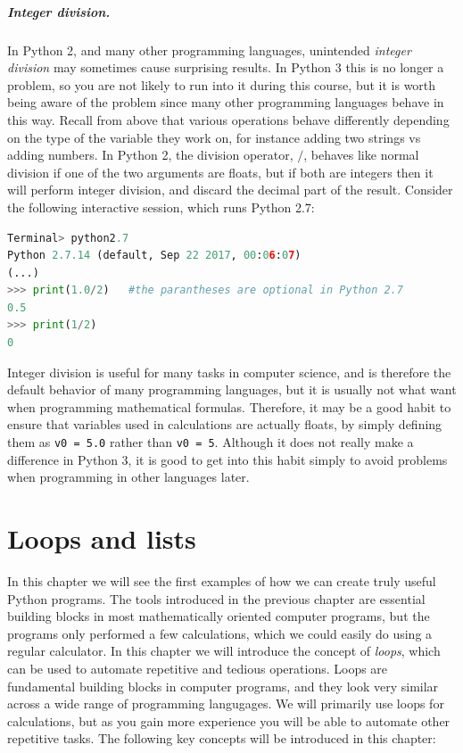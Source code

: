 \documentclass[graybox,envcountchap,sectrefs,final]{svmonodo}
\begin{document}
\paragraph{Integer division.}
In Python 2, and many other programming languages, unintended \emph{integer division} may sometimes cause surprising
results. In Python 3 this is no longer a problem, so you are not likely to run into it during this course, but
it is worth being aware of the problem since many other programming languages behave in this way. Recall from above that
various operations behave differently depending on the type of the variable they work on, for instance adding two strings
vs adding numbers. In Python 2, the division operator, $/$, behaves like normal division if one of the two arguments
are floats, but if both are integers then it will perform integer division, and discard the decimal part of the result.
Consider the following interactive session, which runs Python 2.7:
\begin{lstlisting}[language=Python,style=blue1]
Terminal> python2.7
Python 2.7.14 (default, Sep 22 2017, 00:06:07)
(...)
>>> print(1.0/2)   #the parantheses are optional in Python 2.7
0.5
>>> print(1/2)
0
\end{lstlisting}


Integer division is useful for many tasks in computer science, and is therefore the default behavior of many
programming languages, but it is usually not what want when programming mathematical formulas. Therefore, it may be
a good habit to ensure that variables used in calculations are actually floats, by simply defining them as \texttt{v0 = 5.0} rather
than \texttt{v0 = 5}. Although it does not really make a difference in Python 3, it is good to get into this habit simply to avoid
problems when programming in other languages later.

\chapter{Loops and lists}
\label{ch:loops}


In this chapter we will see the first examples of how we can create truly useful Python programs.
The tools introduced in the previous chapter are essential building blocks in most
mathematically oriented computer programs, but the programs only performed a few calculations,
which we could easily do using a regular calculator. In this chapter we will introduce the concept
of \emph{loops}, which can be used to automate repetitive and tedious operations. Loops are fundamental
building blocks in computer programs, and they look very similar across a wide range of programming langugages.
We will primarily use loops for calculations, but as you gain more
experience you will be able to automate other repetitive tasks. The following key concepts will be introduced in this chapter:
\end{document}
